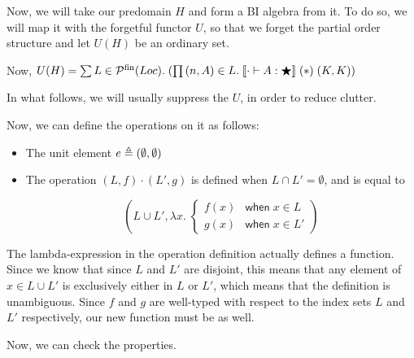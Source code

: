 Now, we will take our predomain $H$ and form a BI algebra from it. To do so, we will
map it with the forgetful functor $U$, so that we forget the partial order structure 
and let $U(H)$ be an ordinary set. 

Now, $U(H) = \sum L \in \powersetfin{Loc}.\; (\prod \sempair{n}{A} \in L.\; \interp{\judgeWK[\cdot]{A}{\bigstar}}\;(*)\;(K,K))$

In what follows, we will usually suppress the $U$, in order to reduce clutter. 

Now, we can define the operations on it as follows: 

\begin{itemize}
\item The unit element $e \triangleq \sempair{\emptyset}{\emptyset}$
\item The operation $(L, f) \cdot (L', g)$ is defined when $L \cap L' = \emptyset$, and
      is equal to 

\begin{displaymath}
 \left(L \cup L', \lambda x.\;\left\{\begin{array}{ll}
                                 f(x) & \mathsf{when}\; x \in L \\
                                 g(x) & \mathsf{when}\; x \in L'
                               \end{array}
                         \right.\right)
 \end{displaymath}
\end{itemize}

The lambda-expression in the operation definition actually defines a
function. Since we know that since $L$ and $L'$ are disjoint, this
means that any element of $x \in L \cup L'$ is exclusively either in
$L$ or $L'$, which means that the definition is unambiguous. Since $f$
and $g$ are well-typed with respect to the index sets $L$ and $L'$
respectively, our new function must be as well.

Now, we can check the properties. 

